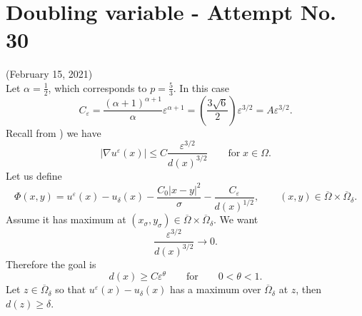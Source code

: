 \documentclass[11pt,reqno]{amsart}
\numberwithin{figure}{section}
\theoremstyle{plain}
\theoremstyle{remark}
\numberwithin{equation}{section}
\begin{document}
\section{Doubling variable - Attempt No. 30}
\noindent (February 15, 2021) \\
Let $\alpha = \frac{1}{2}$, which corresponds to $p = \frac{5}{3}$. In this case
\begin{equation*}
    C_\varepsilon = \frac{(\alpha+1)^{\alpha+1}}{\alpha}\varepsilon^{\alpha+1} = \left(\frac{3\sqrt{6}}{2}\right)\varepsilon^{3/2} = A\varepsilon^{3/2}.
\end{equation*}
Recall from \cite{alessio_asymptotic_2006}) we have
\begin{equation*}
|\nabla u^\varepsilon(x)|  \leq C\frac{\varepsilon^{3/2}}{d(x)^{3/2}} \qquad\text{for}\;x\in \Omega.
\end{equation*}
Let us define
\begin{equation*}
    \Phi(x,y) = u^\varepsilon(x) - u_\delta(x) -\frac{C_0|x-y|^2}{\sigma} - \frac{C_\varepsilon}{d(x)^{1/2}}, \qquad (x,y)\in \overline{\Omega}\times \overline{\Omega}_\delta.
\end{equation*}
Assume it has maximum at $(x_\sigma,y_\sigma)\in \overline{\Omega}\times \overline{\Omega}_\delta$. We want
\begin{equation*}
    \frac{\varepsilon^{3/2}}{d(x)^{3/2}} \rightarrow 0.
\end{equation*}
Therefore the goal is
\begin{equation*}
    d(x)\geq C\varepsilon^\theta \qquad\text{for} \qquad 0<\theta < 1.
\end{equation*}
Let $z\in \overline{\Omega}_\delta$ so that $u^\varepsilon(x) - u_\delta(x)$ has a maximum over $\overline{\Omega}_\delta$ at $z$, then $d(z)\geq \delta$. \\
\end{document}
